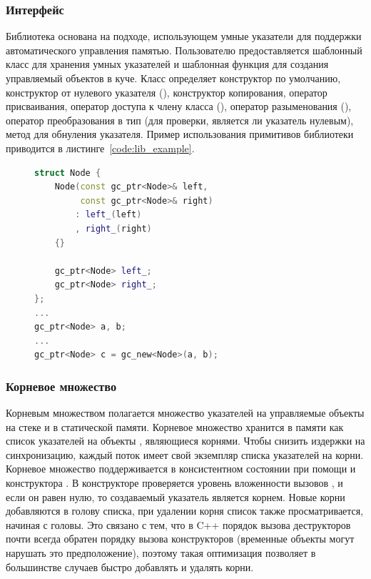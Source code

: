\subsubsection{Интерфейс}
Библиотека основана на подходе, использующем умные указатели для поддержки 
автоматического управления памятью. 
Пользователю предоставляется шаблонный класс  для хранения 
умных указателей и шаблонная функция  для создания 
управляемый объектов в куче. 
Класс  определяет конструктор по умолчанию, конструктор от нулевого указателя 
(), конструктор копирования, оператор присваивания, оператор доступа к члену 
класса (), оператор разыменования (), оператор 
преобразования в тип  (для проверки, является ли указатель нулевым), 
метод  для обнуления указателя. 
Пример использования примитивов библиотеки приводится в листинге~\ref{code:lib_example}. 

\begin{figure}[h!]
\begin{lstlisting}[language={c++}, caption={Пример использования примитивов библиотеки}, 
label={code:lib_example}]
struct Node {
    Node(const gc_ptr<Node>& left, 
         const gc_ptr<Node>& right)
        : left_(left)
        , right_(right)
    {}
    
    gc_ptr<Node> left_;
    gc_ptr<Node> right_;
};
...
gc_ptr<Node> a, b;
...
gc_ptr<Node> c = gc_new<Node>(a, b);
\end{lstlisting}
\end{figure}

\subsubsection{Корневое множество}
Корневым множеством полагается множество указателей на управляемые объекты на стеке и 
в статической памяти. 
Корневое множество хранится в памяти как список указателей на объекты , 
являющиеся корнями. 
Чтобы снизить издержки на синхронизацию, каждый поток имеет свой экземпляр списка 
указателей на корни. 
Корневое множество поддерживается в консистентном состоянии при помощи  и 
конструктора . 
В конструкторе  проверяется уровень вложенности вызовов , и 
если он равен нулю, то создаваемый указатель является корнем. 
Новые корни добавляются в голову списка, при удалении корня список также просматривается, 
начиная с головы. 
Это связано с тем, что в C++ порядок вызова деструкторов почти всегда обратен порядку 
вызова конструкторов (временные объекты могут нарушать это предположение), поэтому такая 
оптимизация позволяет в большинстве случаев быстро добавлять и удалять корни.

